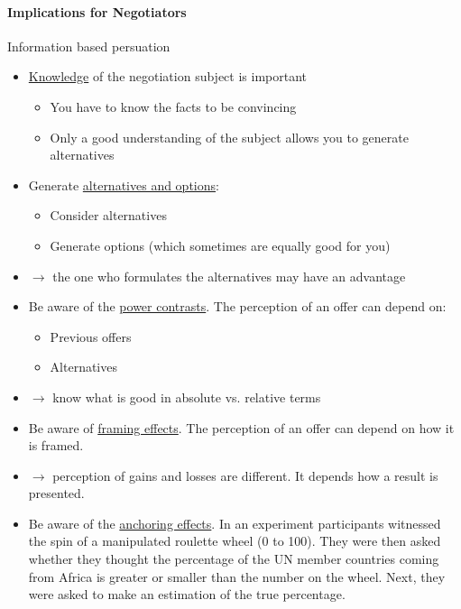 \paragraph{Implications for Negotiators}
Information based persuation
\begin{itemize}
    \item \underline{Knowledge} of the negotiation subject is important
        \begin{itemize}
            \item You have to know the facts to be convincing
            \item Only a good understanding of the subject allows you
                to generate alternatives
        \end{itemize}
    \item Generate \underline{alternatives and options}:
        \begin{itemize}
            \item Consider alternatives
            \item Generate options (which sometimes are equally good for you)
        \end{itemize}
    \item $\rightarrow$ the one who formulates the alternatives may have an
        advantage
    \item Be aware of the \underline{power contrasts}. The perception of
        an offer can depend on:
        \begin{itemize}
            \item Previous offers
            \item Alternatives
        \end{itemize}
    \item $\rightarrow$ know what is good in absolute vs. relative terms
    \item Be aware of \underline{framing effects}. The perception of an offer
        can depend on how it is framed.
    \item $\rightarrow$ perception of gains and losses are different. It
        depends how a result is presented.
    \item Be aware of the \underline{anchoring effects}. In an experiment
        participants witnessed the spin of a manipulated roulette wheel
        (0 to 100). They were then asked whether they thought the percentage
        of the UN member countries coming from Africa is greater or smaller
        than the number on the wheel. Next, they were asked to make an
        estimation of the true percentage.

\end{itemize}
